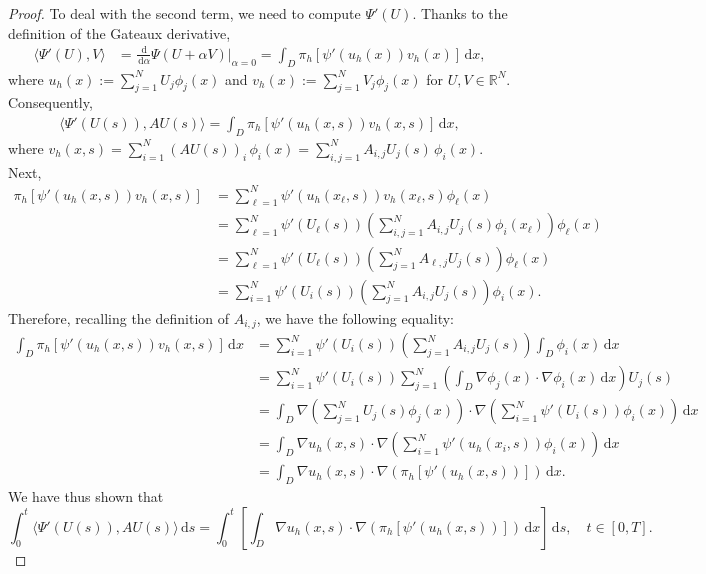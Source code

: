 \documentclass[12pt]{article}
\newcommand{\dd}{\,\mathrm{d}}
\begin{document}
{\begin{proof}
To deal with the second term, we need to compute $\Psi'(U)$. Thanks to the definition of the Gateaux derivative, 
%
\begin{align*}
\langle \Psi'(U),V\rangle &= \frac{\dd}{\dd \alpha} \Psi(U+\alpha V)|_{\alpha=0}
=\int_D \pi_h[\psi'(u_h(x))v_h(x)] \dd x,
\end{align*}
where $u_h(x):=\sum_{j=1}^N U_j \phi_j(x)$ and $v_h(x):=\sum_{j=1}^N V_j \phi_j(x)$ for $U, V \in \mathbb{R}^N$.
%
Consequently, 
%
\begin{align*}
\langle \Psi'(U(s)), AU(s) \rangle =  \int_D \pi_h[\psi'(u_h(x,s))v_h(x,s)] \dd x,
\end{align*}
%
where $v_h(x,s) = \sum_{i=1}^N (AU(s))_i\, \phi_i(x) = \sum_{i,j=1}^N A_{i,j}U_j(s)\, \phi_i(x)$. Next, 
%
\begin{align*} 
\pi_h[\psi'(u_h(x,s))v_h(x,s)]&= \sum_{\ell=1}^N \psi'(u_h(x_\ell,s))v_h(x_\ell,s)\phi_\ell(x) \\
&= \sum_{\ell=1}^N \psi'(U_\ell(s)) \left(\sum_{i,j=1}^N A_{i,j}U_j(s) \phi_i(x_\ell) \right)\phi_\ell(x)\\
&= \sum_{\ell=1}^N\psi'(U_\ell(s))\left(\sum_{j=1}^N A_{\ell,j}U_j(s) \right)\phi_\ell(x) \\
&= \sum_{i=1}^N\psi'(U_i(s))\left(\sum_{j=1}^N A_{i,j}U_j(s) \right)\phi_i(x).
\end{align*}
%
Therefore, recalling the definition of $A_{i,j}$, we have the following equality:
%
\begin{align*}
\int_D \pi_h[\psi'(u_h(x,s))v_h(x,s)]
 \dd x &= \sum_{i=1}^N \psi'(U_i(s))\left(\sum_{j=1}^N A_{i,j}U_j(s) \right) \int_D \phi_i(x) \dd x\\
 &= \sum_{i=1}^N\psi'(U_i(s))\sum_{j=1}^N \left(\int_D \nabla \phi_j(x) \cdot \nabla \phi_i(x) \dd x \right) U_j(s)\\
 &=\int_D \nabla\left(\sum_{j=1}^N U_j(s) \phi_j(x)\right) \cdot \nabla \left(\sum_{i=1}^N \psi'(U_i(s))\phi_i(x) \right)\! \dd x\\
 &= \int_D \nabla u_h(x,s) \cdot \nabla \left(\sum_{i=1}^N \psi'(u_h(x_i,s))\phi_i(x) \right) \!\dd x\\
 &= \int_D \nabla u_h(x,s) \cdot \nabla \left(\pi_h[\psi'(u_h(x,s))]\right) \!\dd x.
\end{align*}
%
We have thus shown that
%
\begin{equation}
\label{eq:second-left}
 \int_0^t \langle \Psi'(U(s)), AU(s)\rangle\dd s = \int_0^t \left[\int_D \nabla u_h(x,s) \cdot \nabla \left(\pi_h[\psi'(u_h(x,s))]\right) \!\dd x \right]\!\! \dd s,\quad t \in [0,T].
 \end{equation}
%


\end{proof}}
\end{document}
